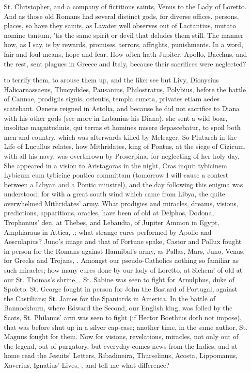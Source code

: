 {St. Christopher, and a company of fictitious saints, Venus to the Lady
of Loretto. And as those old Romans had several distinct gods, for
diverse offices, persons, places, so have they saints, as Lavater
well observes out of Lactantius, mutato nomine tantum, 'tis the same
spirit or devil that deludes them still. The manner how, as I say, is
by rewards, promises, terrors, affrights, punishments. In a word, fair
and foul means, hope and fear. How often hath Jupiter, Apollo, Bacchus,
and the rest, sent plagues in Greece and Italy, because their
sacrifices were neglected?

to terrify them, to arouse them up, and the like: see but Livy,
Dionysius Halicarnassaeus, Thucydides, Pausanius, Philostratus,
Polybius, before the battle of Cannae, prodigiis signis,
ostentis, templa cuncta, privates etiam aedes scatebant. Oeneus reigned
in Aetolia, and because he did not sacrifice to Diana with his other
gods (see more in Labanius his Diana), she sent a wild boar, insolitae
magnitudinis, qui terras et homines misere depascebatur, to spoil both
men and country, which was afterwards killed by Meleager. So Plutarch
in the Life of Lucullus relates, how Mithridates, king of Pontus, at
the siege of Cizicum, with all his navy, was overthrown by Proserpina,
for neglecting of her holy day. She appeared in a vision to Aristagoras
in the night, Cras inquit tybicinem Lybicum cum tybicine pontico
committam (tomorrow I will cause a contest between a Libyan and a
Pontic minstrel), and the day following this enigma was understood; for
with a great south wind which came from Libya, she quite overwhelmed
Mithridates' army. What prodigies and miracles, dreams, visions,
predictions, apparitions, oracles, have been of old at Delphos, Dodona,
Trophonius' den, at Thebes, and Lebaudia, of Jupiter Ammon in Egypt,
Amphiaraus in Attica, \etc{}.; what strange cures performed by Apollo and
Aesculapius? Juno's image and that of Fortune spake, Castor
and Pollux fought in person for the Romans against Hannibal's army, as
Pallas, Mars, Juno, Venus, for Greeks and Trojans, \etc{}. Amongst our
pseudo-Catholics nothing so familiar as such miracles; how many cures
done by our lady of Loretto, at Sichem! of old at our St. Thomas's
shrine, \etc{}. St. Sabine was seen to fight for Arnulphus, duke of
Spoleto. St. George fought in person for John the Bastard of
Portugal, against the Castilians; St. James for the Spaniards in
America. In the battle of Bannockburn, where Edward the Second, our
English king, was foiled by the Scots, St. Philanus' arm was seen to
fight (if Hector Boethius doth not impose), that was before shut
up in a silver cap-case; another time, in the same author, St. Magnus
fought for them. Now for visions, revelations, miracles, not only out
of the legend, out of purgatory, but everyday comes news from the
Indies, and at home read the Jesuits' Letters, Ribadineira,
Thurselinus, Acosta, Lippomanus, Xaverius, Ignatius' Lives, \etc{}, and
tell me what difference?

}
